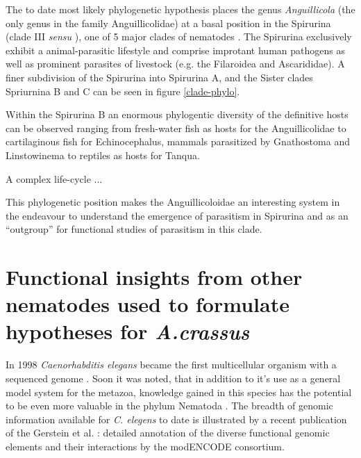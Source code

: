 The to date most likely phylogenetic hypothesis places the genus
\textit{Anguillicola} (the only genus in the family Anguillicolidae)
at a basal position in the Spirurina (clade III \textit{sensu}
\cite{blaxter_molecular_1998}), one of 5 major clades of nematodes
\cite{nadler_molecular_2007, wijov_evolutionary_2006}. The Spirurina
exclusively exhibit a animal-parasitic lifestyle and comprise
improtant human pathogens as well as prominent parasites of livestock
(e.g. the Filaroidea and Ascarididae). A finer subdivision of the
Spirurina into Spirurina A, and the Sister clades Spriurnina B and C
can be seen in figure \ref{clade-phylo}.

Within the Spirurina B an enormous phylogentic diversity of the
definitive hosts can be observed ranging from fresh-water fish as
hosts for the Anguillicolidae to cartilaginous fish for
Echinocephalus, mammals parasitized by Gnathostoma and Linstowinema to
reptiles as hosts for Tanqua.

A complex life-cycle ... 



This phylogenetic position makes the Anguillicoloidae an interesting
system in the endeavour to understand the emergence of parasitism in
Spirurina and as an ``outgroup'' for functional studies of parasitism
in this clade.


\section{Functional insights from other nematodes used to formulate
  hypotheses for \textit{A.crassus}}
\label{func-ins}

In 1998 \textit{Caenorhabditis elegans} became the first multicellular
organism with a sequenced genome \cite{pmid9851916}. Soon it was
noted, that in addition to it's use as a general model system for the
metazoa, knowledge gained in this species has the potential to be even
more valuable in the phylum Nematoda
\cite{blaxter_caenorhabditis_1998}. The breadth of genomic information
available for \textit{C. elegens} to date is illustrated by a recent
publication of the Gerstein et al. \cite{pmid21177976}: detailed
annotation of the diverse functional genomic elements and their
interactions by the modENCODE consortium.

